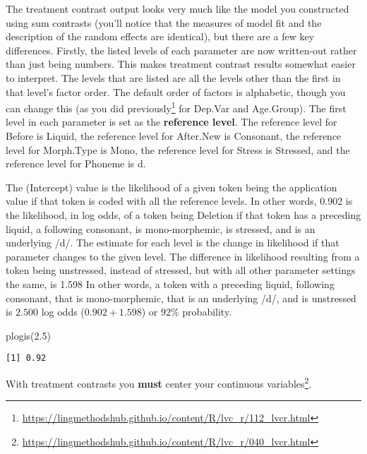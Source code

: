 \documentclass[
  10pt,
  letterpaper]{article}
\newenvironment{Shaded}{\begin{snugshade}}{\end{snugshade}}
\newcommand{\FloatTok}[1]{\textcolor[rgb]{0.68,0.00,0.00}{#1}}
\newcommand{\FunctionTok}[1]{\textcolor[rgb]{0.28,0.35,0.67}{#1}}
\newcommand{\NormalTok}[1]{\textcolor[rgb]{0.00,0.23,0.31}{#1}}
\renewcommand\texttt[1]{{\ttfamily\color{BrickRed}#1}}
\DeclareRobustCommand{\href}[2]{#2\footnote{\url{#1}}}
\begin{document}
The treatment contrast output looks very much like the model you
constructed using sum contrasts (you'll notice that the measures of
model fit and the description of the random effects are identical), but
there are a few key differences. Firstly, the listed levels of each
parameter are now written-out rather than just being numbers. This makes
treatment contrast results somewhat easier to interpret. The levels that
are listed are all the levels other than the first in that level's
factor order. The default order of factors is alphabetic, though you can
change this (as you did
\href{https://lingmethodshub.github.io/content/R/lvc_r/112_lvcr.html}{previously}
for \texttt{Dep.Var} and \texttt{Age.Group}). The first level in each
parameter is set as the \textbf{reference level}. The reference level
for \texttt{Before} is \texttt{Liquid}, the reference level for
\texttt{After.New} is \texttt{Consonant}, the reference level for
\texttt{Morph.Type} is \texttt{Mono}, the reference level for
\texttt{Stress} is \texttt{Stressed}, and the reference level for
\texttt{Phoneme} is \texttt{d}.

The \texttt{(Intercept)} value is the likelihood of a given token being
the application value if that token is coded with all the reference
levels. In other words, \texttt{0.902} is the likelihood, in log odds,
of a token being \texttt{Deletion} if that token has a preceding liquid,
a following consonant, is mono-morphemic, is stressed, and is an
underlying /d/. The estimate for each level is the change in likelihood
if that parameter changes to the given level. The difference in
likelihood resulting from a token being unstressed, instead of stressed,
but with all other parameter settings the same, is \texttt{1.598} In
other words, a token with a preceding liquid, following consonant, that
is mono-morphemic, that is an underlying /d/, and is unstressed is
\(2.500\) log odds (\(0.902+1.598\)) or \(92\%\) probability.

\begin{Shaded}
\begin{Highlighting}[]
\FunctionTok{plogis}\NormalTok{(}\FloatTok{2.5}\NormalTok{)}
\end{Highlighting}
\end{Shaded}

\begin{verbatim}
[1] 0.92
\end{verbatim}

\begin{tcolorbox}[enhanced jigsaw, toptitle=1mm, colframe=quarto-callout-warning-color-frame, toprule=.15mm, opacityback=0, rightrule=.15mm, arc=.35mm, left=2mm, breakable, leftrule=.75mm, colbacktitle=quarto-callout-warning-color!10!white, bottomtitle=1mm, opacitybacktitle=0.6, coltitle=black, bottomrule=.15mm, titlerule=0mm, title=\textcolor{quarto-callout-warning-color}{\faExclamationTriangle}\hspace{0.5em}{Warning}, colback=white]

With treatment contrasts you \textbf{must}
\href{https://lingmethodshub.github.io/content/R/lvc_r/040_lvcr.html}{center
your continuous variables}.

\end{tcolorbox}
\end{document}
